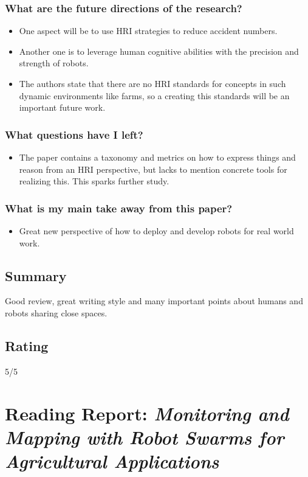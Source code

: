 \subsubsection*{What are the future directions of the research?}
\begin{itemize}
    \item One aspect will be to use HRI strategies to reduce accident numbers.
    \item Another one is to leverage human cognitive abilities with the precision and strength of robots.
    \item The authors state that there are no HRI standards for concepts in such dynamic environments like farms, so a creating this standards will be an important future work.
\end{itemize}
\subsubsection*{What questions have I left?}
\begin{itemize}
    \item The paper contains a taxonomy and metrics on how to express things and reason from an HRI perspective, but lacks to mention concrete tools for realizing this. This sparks further study.
\end{itemize}
\subsubsection*{What is my main take away from this paper?}
\begin{itemize}
    \item Great new perspective of how to deploy and develop robots for real world work.
\end{itemize}

\subsection*{Summary}
Good review, great writing style and many important points about humans and robots sharing close spaces. 

\subsection*{Rating}
5/5



\section{Reading Report: \emph{Monitoring and Mapping with Robot Swarms for Agricultural Applications}}
\cite{Albani2017}

